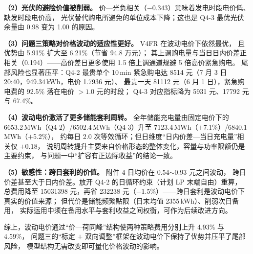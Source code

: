 \textbf{（2）光伏的避险价值被削弱。} 价—光负相关（$-0.343$）意味着发电时段电价低、缺发时段电价高，
光伏替代购电所避免的单位成本下降；这也是 Q4-3 最优光伏余量由 0.98 变为 1.00 的原因。

\textbf{（3）问题三策略对价格波动的适应性更好。} V4FR 在波动电价下依然最优，
且优势由 5.91\% 扩大至 6.21\%（节省 94.8 万元）；
其上调购电量与当日日内价差正相关（0.194）——高价差日更多使用 1.5 倍上调通道规避 5 倍高价紧急购电。
尾部风险也显著压平：Q4-2 最贵单个 10\,min 紧急购电达 8514 元（7 月 3 日 20:40，949.34\,kWh，电价 1.7936 元）、
最贵一天 81112 元（6 月 1 日），紧急购电费的 92.5\% 落在电价 $>1.0$ 元的时段；
Q4-3 对应指标降为 5931 元、17792 元与 67.4\%。

\textbf{（4）波动电价激活了更多储能套利周转。} 全年储能充电量由固定电价下的
6653.2\,MWh（Q4-2）/6502.4\,MWh（Q4-3）升至 7123.4\,MWh（$+$7.1\%）/6840.1\,MWh（$+$5.2\%），
约每日 2.0 次等效循环；但日维度“日内价差—当日充电量”相关仅 $+0.18$，
说明周转提升主要来自价格形态的整体变化，容量与功率限额仍是主要约束，
与问题一中“扩容有正边际收益”的结论一致。

\textbf{（5）敏感性：跨日套利的价值。} 附件 4 日均价在 0.54$\sim$0.93 元之间波动，
跨日价差甚至大于日内价差。放开 Q4-2 的日循环约束（计划 LP 末端自由）重算，
总费用降至 15031398 元，再省 232238 元（$-$1.5\%）——跨日套利是波动电价下真实的价值来源；
但代价是储能频繁贴限（日末均值 2355\,kWh）、削弱次日备用，
实际运用中须在备用水平与套利收益之间权衡，可作为后续改进方向。

综上，波动电价通过“价—荷同峰”结构使两种策略费用分别上升 4.93\% 与 4.59\%，
问题三的“标定 $+$ 双向调整”框架在波动电价下保持了优势并压平了尾部风险，
模型结构无需改变即可量化价格波动的影响。
